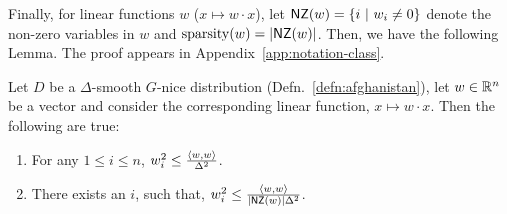Finally, for linear functions $w$ ($x \mapsto w \cdot x$), let $\mathsf{NZ}(w) = \{ i
~|~ w_i \neq 0 \}$ denote the non-zero variables in $w$ and $\mathrm{sparsity}(w) =
|\mathsf{NZ}(w)|$. Then, we have the following Lemma. The proof appears in
Appendix~\ref{app:notation-class}.

\begin{lemma} \label{lemma:amsterdam} Let $D$ be a $\Delta$-smooth $G$-nice
distribution (Defn.~\ref{defn:afghanistan}), let $w \in \mathbb{R}^n$ be a vector
and consider the corresponding linear function, $x \mapsto w \cdot x$. Then the
following are true:
\begin{enumerate}
\item For any $1 \leq i \leq n$, $w_i^2 \leq \frac{\langle w, w \rangle}{\Delta^2}$.
\item There exists an $i$, such that, $w_i^2 \leq
\frac{\langle w, w \rangle}{|\mathsf{NZ}(w)|\Delta^2}$.
\end{enumerate}
\end{lemma}
